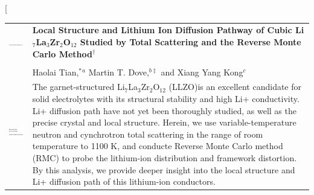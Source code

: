\documentclass[twoside,twocolumn,9pt]{article}
\begin{document}
\twocolumn[
  \begin{@twocolumnfalse}
\vspace{3cm}
\sffamily
\begin{tabular}{m{4.5cm} p{13.5cm} }

\includegraphics{head_foot/DOI} & \noindent\LARGE{\textbf{Local Structure and Lithium Ion Diffusion Pathway of Cubic Li$_7$La$_3$Zr$_2$O$_{12}$ Studied by Total Scattering and the Reverse Monte Carlo Method$^\dag$}} \\%
\vspace{0.3cm} & \vspace{0.3cm} \\

 & \noindent\large{Haolai Tian,$^{\ast}$\textit{$^{a}$} Martin T. Dove,\textit{$^{b\ddag}$} and Xiang Yang Kong\textit{$^{c}$}} \\%

\includegraphics{head_foot/dates} & \noindent\normalsize{ 
The garnet-structured Li$_7$La$_3$Zr$_2$O$_12$ (LLZO)is an excellent candidate for solid electrolytes with its structural stability and high Li+ conductivity. Li+ diffusion path have not yet been thoroughly studied, as well as the precise crystal and local structure. Herein, we use variable-temperature neutron and cynchrotron total scattering in the range of room temperature to 1100 K, and conducte
Reverse Monte Carlo method (RMC) to probe the lithium-ion distribution and framework distortion.
By this analysis, we provide deeper insight into the local structure and Li+ diffusion path of this lithium-ion conductors.

} \\

\end{tabular}

 \end{@twocolumnfalse} \vspace{0.6cm}
\end{document}
